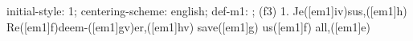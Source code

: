 initial-style: 1;
centering-scheme: english;
def-m1: \grealign;
(f3) 1. Je([em1]iv)sus,([em1]h) Re([em1]f)deem-([em1]gv)er,([em1]hv) save([em1]g) us([em1]f) all,([em1]e)